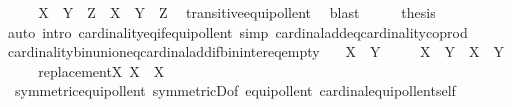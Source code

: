 \begin{isabellebody}
\ \ \isamarkupfalse%
\ \isamarkupfalse%
\ {\isachardoublequoteopen}{\isacharbar}{\kern0pt}{\isacharparenleft}{\kern0pt}X\ {\isasymCoprod}\ Y{\isacharparenright}{\kern0pt}{\isacharbar}{\kern0pt}\ {\isasymCoprod}\ Z\ {\isasymapprox}\ X\ {\isasymCoprod}\ {\isacharbar}{\kern0pt}Y\ {\isasymCoprod}\ Z{\isacharbar}{\kern0pt}{\isachardoublequoteclose}\ \isamarkupfalse%
\ transitive{\isacharunderscore}{\kern0pt}equipollent\ \isamarkupfalse%
\ blast\isanewline
\ \ \isamarkupfalse%
\ \isamarkupfalse%
\ {\isacharquery}{\kern0pt}thesis\isanewline
\ \ \ \ \isamarkupfalse%
\ {\isacharparenleft}{\kern0pt}auto\ intro{\isacharcolon}{\kern0pt}\ cardinality{\isacharunderscore}{\kern0pt}eq{\isacharunderscore}{\kern0pt}if{\isacharunderscore}{\kern0pt}equipollent\ simp{\isacharcolon}{\kern0pt}\ cardinal{\isacharunderscore}{\kern0pt}add{\isacharunderscore}{\kern0pt}eq{\isacharunderscore}{\kern0pt}cardinality{\isacharunderscore}{\kern0pt}coprod{\isacharparenright}{\kern0pt}\isanewline
{}\isamarkupfalse%
%
\endisatagproof
{\isafoldproof}%
%
\isadelimproof
\isanewline
%
\endisadelimproof
\isanewline
{}\isamarkupfalse%
\ cardinality{\isacharunderscore}{\kern0pt}bin{\isacharunderscore}{\kern0pt}union{\isacharunderscore}{\kern0pt}eq{\isacharunderscore}{\kern0pt}cardinal{\isacharunderscore}{\kern0pt}add{\isacharunderscore}{\kern0pt}if{\isacharunderscore}{\kern0pt}bin{\isacharunderscore}{\kern0pt}inter{\isacharunderscore}{\kern0pt}eq{\isacharunderscore}{\kern0pt}empty{\isacharcolon}{\kern0pt}\isanewline
\ \ \ {\isachardoublequoteopen}X\ {\isasyminter}\ Y\ {\isacharequal}{\kern0pt}\ {\isacharbraceleft}{\kern0pt}{\isacharbraceright}{\kern0pt}{\isachardoublequoteclose}\isanewline
\ \ \ {\isachardoublequoteopen}{\isacharbar}{\kern0pt}X\ {\isasymunion}\ Y{\isacharbar}{\kern0pt}\ {\isacharequal}{\kern0pt}\ {\isacharbar}{\kern0pt}X{\isacharbar}{\kern0pt}\ {\isasymoplus}\ {\isacharbar}{\kern0pt}Y{\isacharbar}{\kern0pt}{\isachardoublequoteclose}\isanewline
%
\isadelimproof
%
\endisadelimproof
%
\isatagproof
{}\isamarkupfalse%
\ {\isacharminus}{\kern0pt}\isanewline
\ \ \isamarkupfalse%
\ replacement{\isacharcolon}{\kern0pt}{\isachardoublequoteopen}{\isasymAnd}X{\isachardot}{\kern0pt}\ X\ {\isasymapprox}\ {\isacharbar}{\kern0pt}X{\isacharbar}{\kern0pt}{\isachardoublequoteclose}\ \ \isanewline
\ \ \ \ \isamarkupfalse%
\ \ symmetric{\isacharunderscore}{\kern0pt}equipollent\ symmetricD{\isacharbrackleft}{\kern0pt}of\ equipollent{\isacharbrackright}{\kern0pt}\ cardinal{\isacharunderscore}{\kern0pt}equipollent{\isacharunderscore}{\kern0pt}self\isanewline

\end{isabellebody}
